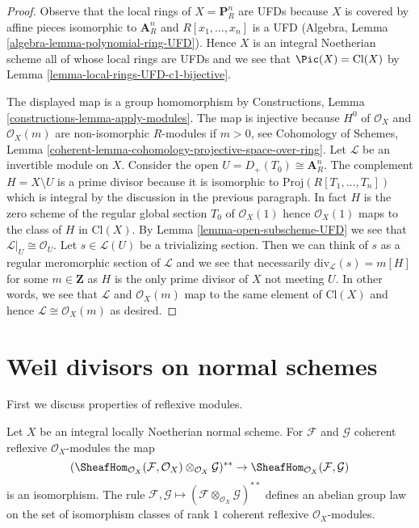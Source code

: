 \begin{proof}
Observe that the local rings of $X = \mathbf{P}^n_R$ are
UFDs because $X$ is covered by affine pieces isomorphic
to $\mathbf{A}^n_R$ and $R[x_1, \ldots, x_n]$ is a UFD
(Algebra, Lemma \ref{algebra-lemma-polynomial-ring-UFD}).
Hence $X$ is an integral Noetherian scheme all of whose
local rings are UFDs and we see that $\Pic(X) = \text{Cl}(X)$
by Lemma \ref{lemma-local-rings-UFD-c1-bijective}.

\medskip\noindent
The displayed map is a group homomorphism by
Constructions, Lemma \ref{constructions-lemma-apply-modules}.
The map is injective because $H^0$ of
$\mathcal{O}_X$ and $\mathcal{O}_X(m)$ are non-isomorphic $R$-modules
if $m > 0$, see Cohomology of Schemes, Lemma
\ref{coherent-lemma-cohomology-projective-space-over-ring}.
Let $\mathcal{L}$ be an invertible module on $X$.
Consider the open $U = D_+(T_0) \cong \mathbf{A}^n_R$.
The complement $H = X \setminus U$ is a prime divisor because it is
isomorphic to $\text{Proj}(R[T_1, \ldots, T_n])$ which is
integral by the discussion in the previous paragraph.
In fact $H$ is the zero scheme of the regular global
section $T_0$ of $\mathcal{O}_X(1)$
hence $\mathcal{O}_X(1)$ maps to the class of $H$ in $\text{Cl}(X)$.
By Lemma \ref{lemma-open-subscheme-UFD} we see that
$\mathcal{L}|_U \cong \mathcal{O}_U$.
Let $s \in \mathcal{L}(U)$ be a trivializing section.
Then we can think of $s$ as a regular meromorphic section
of $\mathcal{L}$ and we see that necessarily
$\text{div}_\mathcal{L}(s) = m[H]$ for some $m \in \mathbf{Z}$
as $H$ is the only prime divisor of $X$ not meeting $U$.
In other words, we see that $\mathcal{L}$ and
$\mathcal{O}_X(m)$ map to the same element of $\text{Cl}(X)$
and hence $\mathcal{L} \cong \mathcal{O}_X(m)$
as desired.
\end{proof}






\section{Weil divisors on normal schemes}
\label{section-weil-divisors-normal}

\noindent
First we discuss properties of reflexive modules.

\begin{lemma}
\label{lemma-reflexive-normal}
Let $X$ be an integral locally Noetherian normal scheme.
For $\mathcal{F}$ and $\mathcal{G}$ coherent reflexive
$\mathcal{O}_X$-modules the map
$$
(\SheafHom_{\mathcal{O}_X}(\mathcal{F}, \mathcal{O}_X)
\otimes_{\mathcal{O}_X} \mathcal{G})^{**} \to
\SheafHom_{\mathcal{O}_X}(\mathcal{F}, \mathcal{G})
$$
is an isomorphism. The rule $\mathcal{F}, \mathcal{G} \mapsto
(\mathcal{F} \otimes_{\mathcal{O}_X} \mathcal{G})^{**}$
defines an abelian group law on the set of isomorphism classes of rank $1$
coherent reflexive $\mathcal{O}_X$-modules.
\end{lemma}

